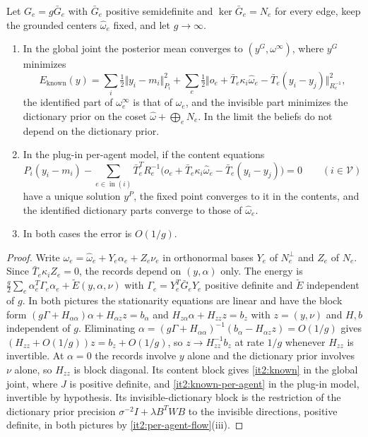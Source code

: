 \documentclass[11pt,letterpaper]{report}
\newcommand{\inn}{\operatorname{in}}
\begin{document}
Let $G_e=g\bar G_e$ with $\bar G_e$ positive semidefinite and $\ker\bar G_e=N_e$ for every edge, keep the grounded centers $\hat\omega_e$ fixed, and let $g\to\infty$.
\begin{enumerate}
\item[(i)] In the global joint the posterior mean converges to $(y^G,\omega^\infty)$, where $y^G$ minimizes
\begin{equation}
E_{\mathrm{known}}(y)=\sum_i\tfrac12\Vert y_i-m_i\Vert_{P_i}^2+\sum_e\tfrac12\bigl\Vert o_e+\bar T_e\kappa_i\hat\omega_e-\bar T_e(y_i-y_j)\bigr\Vert_{R_e^{-1}}^2,
\label{it2:known}
\end{equation}
the identified part of $\omega^\infty_e$ is that of $\hat\omega_e$, and the invisible part minimizes the dictionary prior on the coset $\hat\omega+\bigoplus_eN_e$. In the limit the beliefs do not depend on the dictionary prior.
\item[(ii)] In the plug-in per-agent model, if the content equations
\begin{equation}
P_i(y_i-m_i)-\sum_{e\in\inn(i)}\bar T_e^TR_e^{-1}\bigl(o_e+\bar T_e\kappa_i\hat\omega_e-\bar T_e(y_i-y_j)\bigr)=0\qquad(i\in\mathcal V)
\label{it2:known-per-agent}
\end{equation}
have a unique solution $y^P$, the fixed point converges to it in the contents, and the identified dictionary parts converge to those of $\hat\omega_e$.
\item[(iii)] In both cases the error is $O(1/g)$.
\end{enumerate}
\begin{proof}
Write $\omega_e=\hat\omega_e+Y_e\alpha_e+Z_e\nu_e$ in orthonormal bases $Y_e$ of $N_e^\perp$ and $Z_e$ of $N_e$. Since $\bar T_e\kappa_iZ_e=0$, the records depend on $(y,\alpha)$ only. The energy is $\frac g2\sum_e\alpha_e^T\Gamma_e\alpha_e+\tilde E(y,\alpha,\nu)$ with $\Gamma_e=Y_e^T\bar G_eY_e$ positive definite and $\tilde E$ independent of $g$. In both pictures the stationarity equations are linear and have the block form $(g\Gamma+H_{\alpha\alpha})\alpha+H_{\alpha z}z=b_\alpha$ and $H_{z\alpha}\alpha+H_{zz}z=b_z$ with $z=(y,\nu)$ and $H,b$ independent of $g$. Eliminating $\alpha=(g\Gamma+H_{\alpha\alpha})^{-1}(b_\alpha-H_{\alpha z}z)=O(1/g)$ gives $(H_{zz}+O(1/g))z=b_z+O(1/g)$, so $z\to H_{zz}^{-1}b_z$ at rate $1/g$ whenever $H_{zz}$ is invertible. At $\alpha=0$ the records involve $y$ alone and the dictionary prior involves $\nu$ alone, so $H_{zz}$ is block diagonal. Its content block gives \cref{it2:known} in the global joint, where $J$ is positive definite, and \cref{it2:known-per-agent} in the plug-in model, invertible by hypothesis. Its invisible-dictionary block is the restriction of the dictionary prior precision $\sigma^{-2}I+\lambda B^TWB$ to the invisible directions, positive definite, in both pictures by \cref{it2:per-agent-flow}(iii).
\end{proof}
\end{document}
